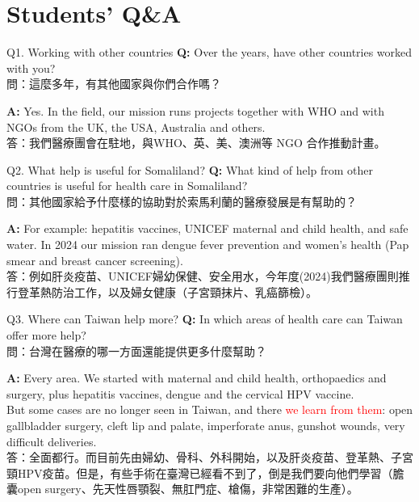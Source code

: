 \documentclass[aspectratio=169]{beamer}
\begin{document}
\section[Q\&A]{Students' Q\&A}

\begin{frame}{Q1. Working with other countries}
\textbf{Q:} Over the years, have other countries worked with you? \\
{\footnotesize\color{gray}問：這麼多年，有其他國家與你們合作嗎？}

\vspace{0.8em}
\textbf{A:} Yes. In the field, our mission runs projects together with WHO and with NGOs from the UK, the USA, Australia and others. \\
{\footnotesize\color{gray}答：我們醫療團會在駐地，與WHO、英、美、澳洲等 NGO 合作推動計畫。}
\end{frame}

\begin{frame}{Q2. What help is useful for Somaliland?}
\textbf{Q:} What kind of help from other countries is useful for health care in Somaliland? \\
{\footnotesize\color{gray}問：其他國家給予什麼樣的協助對於索馬利蘭的醫療發展是有幫助的？}

\vspace{0.8em}
\textbf{A:} For example: hepatitis vaccines, UNICEF maternal and child health, and safe water. In 2024 our mission ran dengue fever prevention and women's health (Pap smear and breast cancer screening). \\
{\footnotesize\color{gray}答：例如肝炎疫苗、UNICEF婦幼保健、安全用水，今年度(2024)我們醫療團則推行登革熱防治工作，以及婦女健康（子宮頸抹片、乳癌篩檢）。}
\end{frame}

\begin{frame}{Q3. Where can Taiwan help more?}
\textbf{Q:} In which areas of health care can Taiwan offer more help? \\
{\footnotesize\color{gray}問：台灣在醫療的哪一方面還能提供更多什麼幫助？}

\vspace{0.8em}
\textbf{A:} Every area. We started with maternal and child health, orthopaedics and surgery, plus hepatitis vaccines, dengue and the cervical HPV vaccine. \\ But some cases are no longer seen in Taiwan, and there \textcolor{red}{we learn from them}: open gallbladder surgery, cleft lip and palate, imperforate anus, gunshot wounds, very difficult deliveries. \\
{\footnotesize\color{gray}答：全面都行。而目前先由婦幼、骨科、外科開始，以及肝炎疫苗、登革熱、子宮頸HPV疫苗。但是，有些手術在臺灣已經看不到了，倒是我們要向他們學習（膽囊open surgery、先天性唇顎裂、無肛門症、槍傷，非常困難的生產）。}
\end{frame}
\end{document}
